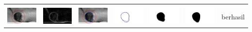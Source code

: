 \begin{table}[H]
\begin{tabular}{|m{0.7in}|m{0.7in}|m{0.7in}|m{0.7in}|m{0.7in}|m{0.7in}|m{0.7in}|}
		&  &  & & & &  \\
		\includegraphics[width=0.7in]{dataset/dataset_3/luka_hitam/ready/5_interp_init.jpg}&
		\includegraphics[width=0.7in]{dataset/dataset_3/luka_hitam/ready/5_interp_ext.jpg}&
		\includegraphics[width=0.7in]{dataset/dataset_3/luka_hitam/ready/5_interp_result.jpg}&
		\includegraphics[width=0.7in]{dataset/dataset_3/luka_hitam/ready/5_gt_r.jpg}&
		\includegraphics[width=0.7in]{dataset/dataset_3/luka_hitam/ready/5_r.jpg}&
		\includegraphics[width=0.7in]{dataset/dataset_3/luka_hitam/ready/5_interp_r.jpg}&
		berhasil\\
		\hline
		

\end{tabular}
\end{table}
